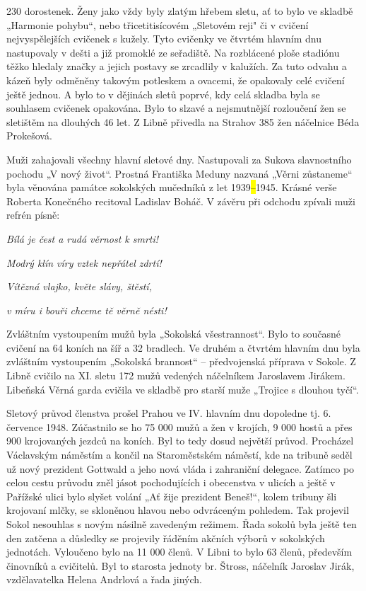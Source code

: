 230 dorostenek. Ženy jako vždy byly zlatým hřebem sletu, ať to bylo ve
skladbě „Harmonie pohybu``, nebo třicetitisícovém „Sletovém reji" či v
cvičení nejvyspělejších cvičenek s kužely. Tyto cvičenky ve čtvrtém
hlavním dnu nastupovaly v dešti a již promoklé ze seřadiště. Na
rozblácené ploše stadiónu těžko hledaly značky a jejich postavy se
zrcadlily v kalužích. Za tuto odvahu a kázeň byly odměněny takovým
potleskem a ovacemi, že opakovaly celé cvičení ještě jednou. A bylo to v
dějinách sletů poprvé, kdy celá skladba byla se souhlasem cvičenek
opakována. Bylo to slzavé a nejsmutnější rozloučení žen se sletištěm na
dlouhých 46 let. Z Libně přivedla na Strahov 385 žen náčelnice Béda
Prokešová.

Muži zahajovali všechny hlavní sletové dny. Nastupovali za Sukova
slavnostního pochodu „V nový život``. Prostná Františka Meduny nazvaná
„Věrni zůstaneme`` byla věnována památce sokolských mučedníků z let
1939\hl{--}1945. Krásné verše Roberta Konečného recitoval Ladislav
Boháč. V závěru při odchodu zpívali muži refrén písně:

\emph{Bílá je čest a rudá věrnost k smrti!}

\emph{Modrý klín víry vztek nepřátel zdrtí!}

\emph{Vítězná vlajko, květe slávy, štěstí,}

\emph{v míru i bouři chceme tě věrně nésti!}

Zvláštním vystoupením mužů byla „Sokolská všestrannost``. Bylo to
současné cvičení na 64 koních na šíř a 32 bradlech. Ve druhém a čtvrtém
hlavním dnu byla zvláštním vystoupením „Sokolská brannost`` --
předvojenská příprava v Sokole. Z Libně cvičilo na XI. sletu 172 mužů
vedených náčelníkem Jaroslavem Jirákem. Libeňská Věrná garda cvičila ve
skladbě pro starší muže „Trojice s dlouhou tyčí``.

Sletový průvod členstva prošel Prahou ve IV. hlavním dnu dopoledne tj.
6. července 1948. Zúčastnilo se ho 75 000 mužů a žen v krojích, 9 000
hostů a přes 900 krojovaných jezdců na koních. Byl to tedy dosud
největší průvod. Procházel Václavským náměstím a končil na Staroměstském
náměstí, kde na tribuně seděl už nový prezident Gottwald a jeho nová
vláda i zahraniční delegace. Zatímco po celou cestu průvodu zněl jásot
pochodujících i obecenstva v ulicích a ještě v Pařížské ulici bylo
slyšet volání „Ať žije prezident Beneš!{}``, kolem tribuny šli krojovaní
mlčky, se skloněnou hlavou nebo odvráceným pohledem. Tak projevil Sokol
nesouhlas s novým násilně zavedeným režimem. Řada sokolů byla ještě ten
den zatčena a důsledky se projevily řáděním akčních výborů v sokolských
jednotách. Vyloučeno bylo na 11 000 členů. V Libni to bylo 63 členů,
především činovníků a cvičitelů. Byl to starosta jednoty br. Štross,
náčelník Jaroslav Jirák, vzdělavatelka Helena Andrlová a řada jiných.

